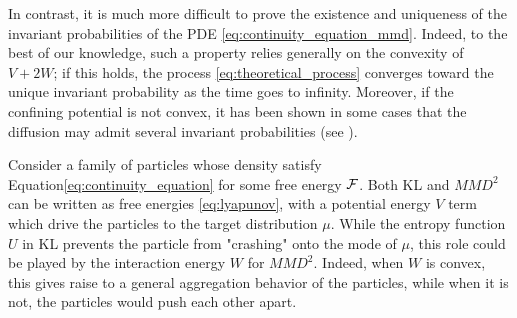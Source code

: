 In contrast, it is much more difficult to prove the existence and uniqueness of the invariant probabilities of the PDE \eqref{eq:continuity_equation_mmd}. 
Indeed, to the best of our knowledge, such a property relies generally on the convexity of $V+2W$; if this holds, the process \eqref{eq:theoretical_process} converges
toward the unique invariant probability as the time goes to infinity. Moreover, if the confining potential is not convex, it has been shown in some cases that the diffusion may admit several invariant probabilities (see \cite{herrmann2010non, tugaut2014phase}).%
\begin{remark}
	Consider a family of particles whose density satisfy Equation\cref{eq:continuity_equation} for some free energy ${{\mathcal F}}$. Both KL and $MMD^2$ can be written as free energies \eqref{eq:lyapunov}, with a potential energy $V$ term which drive the particles to the target distribution $\mu$. While the entropy function $U$ in KL prevents the particle from "crashing" onto the mode of $\mu$, this role could be played by the interaction energy $W$ for $MMD^2$. Indeed, when $W$ is convex, this gives raise to a general aggregation behavior of the particles, while when it is not, the particles would push each other apart.
\end{remark}

 











